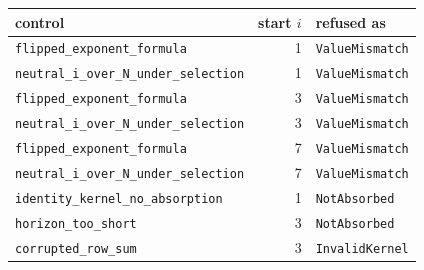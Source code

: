 \begin{tabular}{lrl}
\toprule
control & start $i$ & refused as\\
\midrule
\texttt{flipped\_exponent\_formula} & 1 & \texttt{ValueMismatch} \\
\texttt{neutral\_i\_over\_N\_under\_selection} & 1 & \texttt{ValueMismatch} \\
\texttt{flipped\_exponent\_formula} & 3 & \texttt{ValueMismatch} \\
\texttt{neutral\_i\_over\_N\_under\_selection} & 3 & \texttt{ValueMismatch} \\
\texttt{flipped\_exponent\_formula} & 7 & \texttt{ValueMismatch} \\
\texttt{neutral\_i\_over\_N\_under\_selection} & 7 & \texttt{ValueMismatch} \\
\texttt{identity\_kernel\_no\_absorption} & 1 & \texttt{NotAbsorbed} \\
\texttt{horizon\_too\_short} & 3 & \texttt{NotAbsorbed} \\
\texttt{corrupted\_row\_sum} & 3 & \texttt{InvalidKernel} \\
\bottomrule
\end{tabular}
